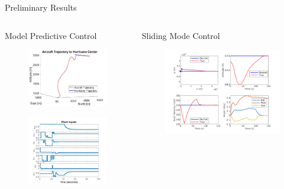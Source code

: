\documentclass[aspectratio=169]{beamer}
\begin{document}
\begin{frame}{Preliminary Results}
    \begin{columns}
        \begin{column}{0.5\textwidth}
            Model Predictive Control
            \begin{figure}
                \centering
                \includegraphics[width=.6\textwidth]{Prelim_MPC_Results.jpg}
            \end{figure}
            \begin{figure}
                \centering
             \includegraphics[width=.55\textwidth]{Prelim_MPC_Inputs.jpg}
            \end{figure}
        \end{column}
        \begin{column}{0.5\textwidth}
            Sliding Mode Control
            \begin{figure}
                \centering
                \includegraphics[width=1\textwidth]{sm_flight.png}

\end{figure}
\end{column}
\end{columns}
\end{frame}
\end{document}
